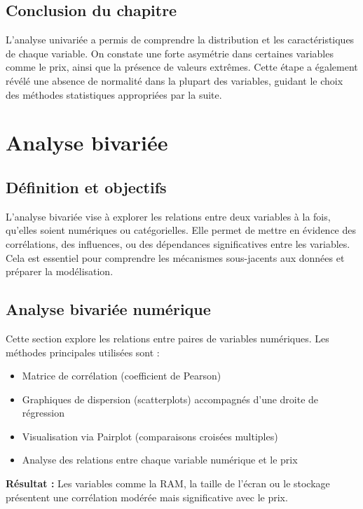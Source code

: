 \documentclass[12pt]{report}
\begin{document}
\section*{Conclusion du chapitre}

L'analyse univariée a permis de comprendre la distribution et les caractéristiques de chaque variable. On constate une forte asymétrie dans certaines variables comme le prix, ainsi que la présence de valeurs extrêmes. Cette étape a également révélé une absence de normalité dans la plupart des variables, guidant le choix des méthodes statistiques appropriées par la suite.


\newpage
\chapter{Analyse bivariée}

\section{Définition et objectifs}
L’analyse bivariée vise à explorer les relations entre deux variables à la fois, qu’elles soient numériques ou catégorielles. Elle permet de mettre en évidence des corrélations, des influences, ou des dépendances significatives entre les variables. Cela est essentiel pour comprendre les mécanismes sous-jacents aux données et préparer la modélisation.

\section{Analyse bivariée numérique}

Cette section explore les relations entre paires de variables numériques. Les méthodes principales utilisées sont :

\begin{itemize}
    \item Matrice de corrélation (coefficient de Pearson)
    \item Graphiques de dispersion (scatterplots) accompagnés d'une droite de régression
    \item Visualisation via Pairplot (comparaisons croisées multiples)
    \item Analyse des relations entre chaque variable numérique et le prix
\end{itemize}

\textbf{Résultat :} Les variables comme la RAM, la taille de l'écran ou le stockage présentent une corrélation modérée mais significative avec le prix.
\end{document}
